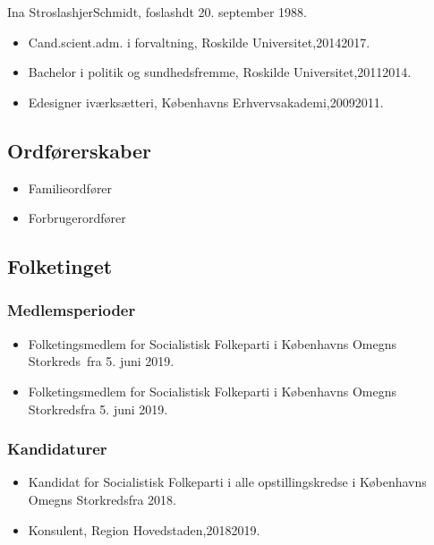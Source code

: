 \documentclass[11pt, a4paper]{awesome-cv}
\begin{document}
\makecvheader[R]
\makelettertitle
\begin{cvletter}
Ina StroslashjerSchmidt, foslashdt 20. september 1988.

\begin{itemize}
\item Cand.scient.adm. i forvaltning, Roskilde Universitet,20142017.
\item Bachelor i politik og sundhedsfremme, Roskilde Universitet,20112014.
\item Edesigner iværksætteri, Københavns Erhvervsakademi,20092011.
\end{itemize}
\subsection*{Ordførerskaber}
\begin{itemize}
\item Familieordfører
\item Forbrugerordfører
\end{itemize}
\subsection*{Folketinget}
\subsubsection*{Medlemsperioder}
\begin{itemize}
\item Folketingsmedlem for Socialistisk Folkeparti i Københavns Omegns Storkreds fra 5. juni 2019.
\item Folketingsmedlem for Socialistisk Folkeparti i Københavns Omegns Storkredsfra 5. juni 2019.
\end{itemize}
\subsubsection*{Kandidaturer}
\begin{itemize}
\item Kandidat for Socialistisk Folkeparti i alle opstillingskredse i Københavns Omegns Storkredsfra 2018.
\end{itemize}
\begin{itemize}
\item Konsulent, Region Hovedstaden,20182019.
\end{itemize}
\end{cvletter}
\end{document}
